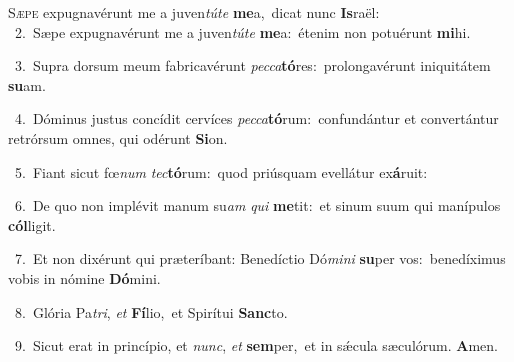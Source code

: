\lettrine{\initial\textcolor{\initialcolor}{S}}{æpe} expugnavérunt me a juven\-\textit{tú}\-\textit{te} \textbf{me}\-a,~\star dicat nunc \textbf{Is}\-raël:\\
{\numbfont\textcolor{\numbcolor}{~2.}}~Sæpe expugnavérunt me a juven\-\textit{tú}\-\textit{te} \textbf{me}\-a:~\star étenim non potuérunt \textbf{mi}\-hi.\par
{\numbfont\textcolor{\numbcolor}{~3.}}~Supra dorsum meum fabricavérunt \textit{pec}\-\textit{ca}\textbf{tó}res:~\star prolongavérunt iniquitátem \textbf{su}\-am.\par
{\numbfont\textcolor{\numbcolor}{~4.}}~Dóminus justus concídit cervíces \textit{pec}\-\textit{ca}\textbf{tó}rum:~\star confundántur et convertántur retrórsum omnes, qui odérunt \textbf{Si}\-on.\par
{\numbfont\textcolor{\numbcolor}{~5.}}~Fiant sicut fœ\textit{num} \textit{tec}\-\textbf{tó}rum:~\star quod priúsquam evellátur ex\-\textbf{á}\-ruit:\par
{\numbfont\textcolor{\numbcolor}{~6.}}~De quo non implévit manum su\textit{am} \textit{qui} \textbf{me}\-tit:~\star et sinum suum qui manípulos \textbf{cól}\-ligit.\par
{\numbfont\textcolor{\numbcolor}{~7.}}~Et non dixérunt qui præteríbant: Benedíctio Dó\-\textit{mi}\-\textit{ni} \textbf{su}\-per vos:~\star benedíximus vobis in nómine \textbf{Dó}\-mini.\par
{\numbfont\textcolor{\numbcolor}{~8.}}~Glória Pa\-\textit{tri}\-, \textit{et} \textbf{Fí}\-lio,~\star et Spirítui \textbf{Sanc}\-to.\par
{\numbfont\textcolor{\numbcolor}{~9.}}~Sicut erat in princípio, et \textit{nunc}\-, \textit{et} \textbf{sem}\-per,~\star et in sǽcula sæculórum. \textbf{A}\-men.\par
